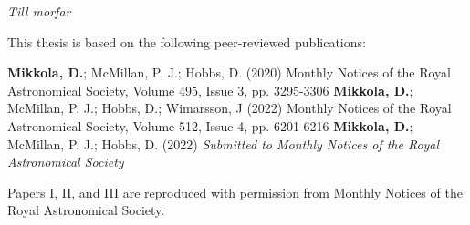 \documentclass[E5,LUFonts]{lundphdthesis}
\begin{document}
\newpage

\vspace*{140pt}
\begin{flushright}
\textit{Till morfar}
\end{flushright}

\cleardoublepage
\frontmatter
\pagestyle{plain}
\setcounter{page}{1} %
\setcounter{tocdepth}{1}
\setcounter{secnumdepth}{2}
\renewcommand{\thesection}{\arabic{chapter}.\arabic{section}}
\tableofcontents


\newpage
{}

This thesis is based on the following peer-reviewed publications:
\vspace{1mm}

{\textbf{Mikkola, D.}; McMillan, P. J.; Hobbs, D. (2020)}
{Monthly Notices of the Royal Astronomical Society, Volume 495, Issue 3, pp. 3295-3306}
{\textbf{Mikkola, D.}; McMillan, P. J.; Hobbs, D.; Wimarsson, J (2022)}
{Monthly Notices of the Royal Astronomical Society, Volume 512, Issue 4, pp. 6201-6216}
{\textbf{Mikkola, D.}; McMillan, P. J.; Hobbs, D. (2022)}
{\textit{Submitted to Monthly Notices of the Royal Astronomical Society}}%
\makephdarticletable


\noindent Papers I, II, and III  are reproduced with permission from Monthly Notices of the Royal Astronomical Society.

\newpage

\end{document}

